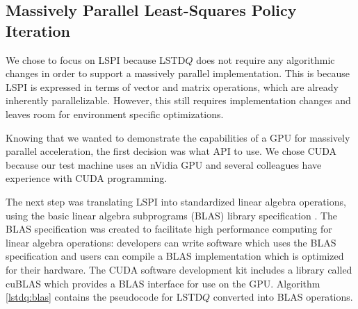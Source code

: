 \subsection{Massively Parallel Least-Squares Policy Iteration}

We chose to focus on LSPI because LSTD$Q$ does not require any algorithmic changes in order to support a massively parallel implementation. This is because LSPI is expressed in terms of vector and matrix operations, which are already inherently parallelizable. However, this still requires implementation changes and leaves room for environment specific optimizations.

Knowing that we wanted to demonstrate the capabilities of a GPU for massively parallel acceleration, the first decision was what API to use. We chose CUDA because our test machine uses an nVidia GPU and several colleagues have experience with CUDA programming.

The next step was translating LSPI into standardized linear algebra operations, using the basic linear algebra subprograms (BLAS) library specification \cite{blas}. The BLAS specification was created to facilitate high performance computing for linear algebra operations: developers can write software which uses the BLAS specification and users can compile a BLAS implementation which is optimized for their hardware. The CUDA software development kit includes a library called cuBLAS which provides a BLAS interface for use on the GPU. Algorithm \ref{lstdq:blas} contains the pseudocode for LSTD$Q$ converted into BLAS operations.

